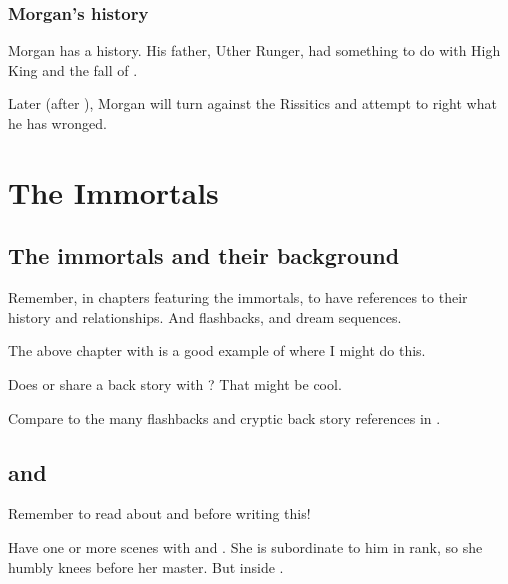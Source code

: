 \subsubsection{Morgan's history}
Morgan has a history. His father, Uther Runger, had something to do with High King \LastHighKing{} and the fall of . 

Later (after \TwilightAngelRememberEmph), Morgan will turn against the Rissitics and attempt to right what he has wronged. 















\section{The Immortals}







\subsection{The immortals and their background}
Remember, in chapters featuring the immortals, to have references to their history and relationships. 
And flashbacks, and dream sequences.

The above chapter with \Achsah{} is a good example of where I might do this. 

Does \Achsah{} or \Teshrial{} share a back story with \Ishnaruchaefir? 
That might be cool. 

Compare to the many flashbacks and cryptic back story references in \cite{StevenEriksonIanCameronEsslemont:MalazanBookoftheFallen}. 









\subsection{\Achsah{} and \Teshrial}
Remember to read about  and  before writing this! 

Have one or more scenes with \Achsah{} and \Teshrial. She is subordinate to him in rank, so she humbly knees before her master. But inside . 

